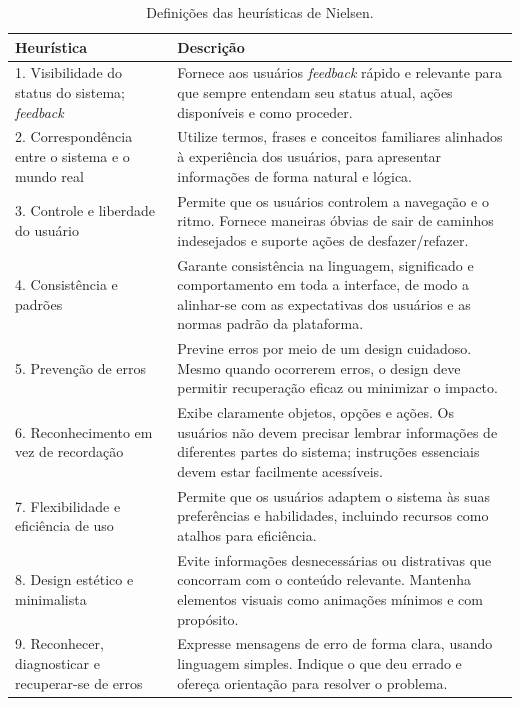 \documentclass[portuguese]{textolivre}
\begin{document}
\begin{table}[h!]
\begin{threeparttable}
\caption{Definições das heurísticas de Nielsen.}
\label{tab2}
\begin{tabular}{p{3.5cm}p{10cm}}
\toprule
Heurística & Descrição \\
\midrule

1. Visibilidade do status do sistema; \textit{feedback} &
Fornece aos usuários \textit{feedback} rápido e relevante para que sempre entendam seu status atual, ações disponíveis e como proceder. \\

2. Correspondência entre o sistema e o mundo real &
Utilize termos, frases e conceitos familiares alinhados à experiência dos usuários, para apresentar informações de forma natural e lógica. \\

3. Controle e liberdade do usuário &
Permite que os usuários controlem a navegação e o ritmo. Fornece maneiras óbvias de sair de caminhos indesejados e suporte ações de desfazer/refazer. \\

4. Consistência e padrões &
Garante consistência na linguagem, significado e comportamento em toda a interface, de modo a alinhar-se com as expectativas dos usuários e as normas padrão da plataforma. \\

5. Prevenção de erros &
Previne erros por meio de um design cuidadoso. Mesmo quando ocorrerem erros, o design deve permitir recuperação eficaz ou minimizar o impacto. \\

6. Reconhecimento em vez de recordação &
Exibe claramente objetos, opções e ações. Os usuários não devem precisar lembrar informações de diferentes partes do sistema; instruções essenciais devem estar facilmente acessíveis. \\

7. Flexibilidade e eficiência de uso &
Permite que os usuários adaptem o sistema às suas preferências e habilidades, incluindo recursos como atalhos para eficiência. \\

8. Design estético e minimalista &
Evite informações desnecessárias ou distrativas que concorram com o conteúdo relevante. Mantenha elementos visuais como animações mínimos e com propósito. \\

9. Reconhecer, diagnosticar e recuperar-se de erros &
Expresse mensagens de erro de forma clara, usando linguagem simples. Indique o que deu errado e ofereça orientação para resolver o problema. \\


\end{tabular}
\end{threeparttable}
\end{table}
\end{document}
